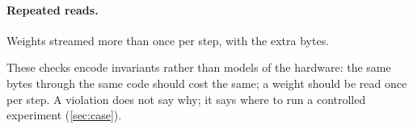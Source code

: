 \paragraph{Repeated reads.} Weights streamed more than once per step, with the extra bytes.

These checks encode invariants rather than models of the hardware: the same bytes through the
same code should cost the same; a weight should be read once per step. A violation does not say
why; it says where to run a controlled experiment (\cref{sec:case}).

